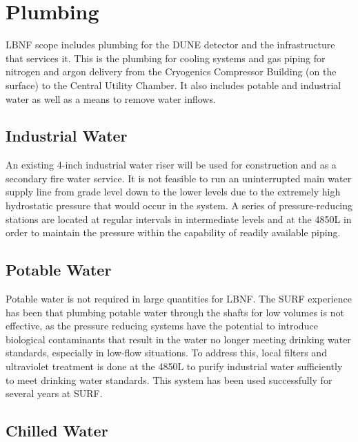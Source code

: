 \section{Plumbing}
\label{sec:fscf-und-plumbing}

LBNF scope includes plumbing for the DUNE detector and the infrastructure that services it. This is the plumbing for cooling systems and gas
 piping for nitrogen and argon delivery from the Cryogenics Compressor Building (on the surface) to the Central Utility Chamber. It also includes potable and industrial water as well as a means to remove water inflows.
 
\subsection{Industrial Water}
\label{sec:fscf-und-ind-h2o}

An existing 4-inch industrial water riser will be used for construction and as a secondary fire water service. It is not feasible to run an uninterrupted main water supply line from grade level down to %
the lower levels due to the extremely high hydrostatic pressure that would occur in the system. A series of pressure-reducing stations are located at regular intervals in intermediate levels and at the 4850L in order to maintain the pressure within the capability of readily available piping.

\subsection{Potable Water}
\label{sec:fscf-und-pot-h2o}

Potable water is not required in large quantities for LBNF. The SURF experience has been that plumbing potable water through the shafts for low volumes is not effective, as the pressure reducing systems have the potential to introduce biological contaminants that result in the water no longer meeting drinking water standards, especially in low-flow situations. To address this, local filters and ultraviolet treatment is done at the 4850L to purify industrial water sufficiently to meet drinking water standards. This system has been used successfully for several years at SURF.

\subsection{Chilled Water}
\label{sec:fscf-und-ch-h2o}

